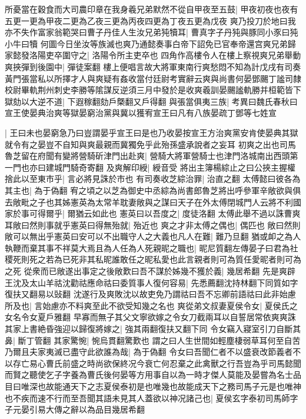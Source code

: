 所憂當在穀食而大司農印章在我身羲兄弟默然不從自甲夜至五鼓|{
	甲夜初夜也夜有五更一更為甲夜二更為乙夜三更為丙夜四更為丁夜五更為戊夜}
爽乃投刀於地曰我亦不失作富家翁範哭曰曹子丹佳人生汝兄弟㹠犢耳|{
	曹真字子丹㹠與豚同小豕曰㹠小牛曰犢}
何圖今日坐汝等族滅也爽乃通懿奏事白帝下詔免已官奉帝還宫爽兄弟歸家懿發洛陽吏卒圍守之|{
	洛陽令所主吏卒也}
四角作高樓令人在樓上察視爽兄弟舉動爽挾彈到後園中|{
	彈徒案翻}
樓上便唱言故大將軍東南行爽愁悶不知為計戊戌有司奏黃門張當私以所擇才人與爽疑有姦收當付廷尉考實辭云爽與尚書何晏鄧颺丁謐司隸校尉畢軌荆州刺史李勝等隂謀反逆須三月中發於是收爽羲訓晏颺謐軌勝并桓範皆下獄劾以大逆不道|{
	下遐稼翻劾戶槩翻又戶得翻}
與張當俱夷三族|{
	考異曰魏氏春秋曰宣王使晏典治爽等獄晏窮治黨與冀以獲宥宣王曰凡有八族晏疏丁鄧等七姓宣}


|{
	王曰未也晏窮急乃曰豈謂晏乎宣王曰是也乃收晏按宣王方治爽黨安肯使晏典其獄就令有之晏豈不自知與爽最親而冀獨免乎此殆孫盛承說者之妄耳}
初爽之出也司馬魯芝留在府聞有變將營騎斫津門出赴爽|{
	營騎大將軍營騎士也津門洛城南出西頭第一門也亦曰建城門騎奇寄翻}
及爽解印綬|{
	綬音受}
將出主簿楊綜止之曰公挾主握權捨此以至東市乎|{
	言必將見誅於市也}
有司奏收芝綜治罪|{
	治直之翻}
太傅懿曰彼各為其主也|{
	為于偽翻}
宥之頃之以芝為御史中丞綜為尚書郎魯芝將出呼參軍辛敞欲與俱去敞毗之子也其姊憲英為太常羊耽妻敞與之謀曰天子在外太傅閉城門人云將不利國家於事可得爾乎|{
	爾猶云如此也}
憲英曰以吾度之|{
	度徒洛翻}
太傅此舉不過以誅曹爽耳敞曰然則事就乎憲英曰得無殆就|{
	殆近也}
爽之才非太傅之偶也|{
	偶匹也}
敞曰然則敞可以無出乎憲英曰安可以不出職守人之大義也凡人在難|{
	難乃旦翻}
猶或卹之為人執鞭而棄其事不祥莫大焉且為人任為人死親昵之職也|{
	昵尼質翻左傳晏子曰君為社稷死則死之若為已死非其私昵誰敢任之昵私愛也此言親者則可為質任愛昵者則可為之死}
從衆而已敞遂出事定之後敞歎曰吾不謀於姊幾不獲於義|{
	幾居希翻}
先是爽辟王沈及太山羊祜沈勸祜應命祜曰委質事人復何容易|{
	先悉薦翻沈持林翻下同質如字復扶又翻易以䜴翻}
沈遂行及爽敗沈以故吏免乃謂祜曰吾不忘卿前語祜曰此非始慮所及也|{
	言始慮亦不料爽至此不欲受知幾之名也}
爽從弟文叔妻夏侯令女|{
	夏侯氏之女名令女夏戶雅翻}
早寡而無子其父文寧欲嫁之令女刀截兩耳以自誓居常依爽爽誅其家上書絶昏強迎以歸復將嫁之|{
	強其兩翻復扶又翻下同}
令女竊入寢室引刀自斷其鼻|{
	斷丁管翻}
其家驚惋|{
	惋烏貫翻驚歎也}
謂之曰人生世間如輕塵棲弱草耳何至自苦乃爾且夫家夷滅已盡守此欲誰為哉|{
	為于偽翻}
令女曰吾聞仁者不以盛衰改節義者不以存亡易心曹氏前盛之時尚欲保終况今衰亡何忍棄之此禽獸之行吾豈為乎司馬懿聞而賢之聽使乞子字養為曹氏後何晏等方用事自以為一時才傑人莫能及晏嘗為名士品目曰唯深也故能通天下之志夏侯泰初是也唯幾也故能成天下之務司馬子元是也唯神也不疾而速不行而至吾聞其語未見其人蓋欲以神况諸己也|{
	夏侯玄字泰初司馬師字子元晏引易大傳之辭以為品目幾居希翻}
